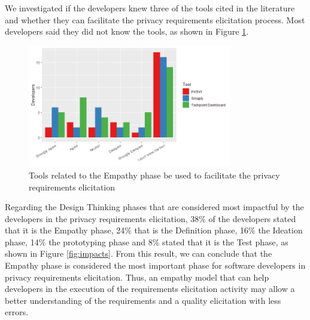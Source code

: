 \documentclass[conference]{IEEEtran}
\begin{document}
We investigated if the developers knew three of the tools cited in the literature and whether they can facilitate the privacy requirements elicitation process. Most developers said they did not know the tools, as shown in Figure \ref{fig:tool}.

\begin{figure}
    \centering
    \includegraphics[width=3.5in]{Figures/RQ18.png}
    \caption{Tools related to the Empathy phase be used to facilitate the privacy requirements elicitation}
    \label{fig:tool}
\end{figure}


Regarding the Design Thinking phases that are considered most impactful by the developers in the privacy requirements elicitation, 38\% of the developers stated that it is the Empathy phase, 24\% that is the Definition phase, 16\% the Ideation phase, 14\% the prototyping phase and 8\% stated that it is the Test phase, as shown in Figure \ref{fig:impacts}. From this result, we can conclude that the Empathy phase is considered the most important phase for software developers in privacy requirements elicitation. Thus, an empathy model that can help developers in the execution of the requirements elicitation activity may allow a better understanding of the requirements and a quality elicitation with less errors.
\end{document}
